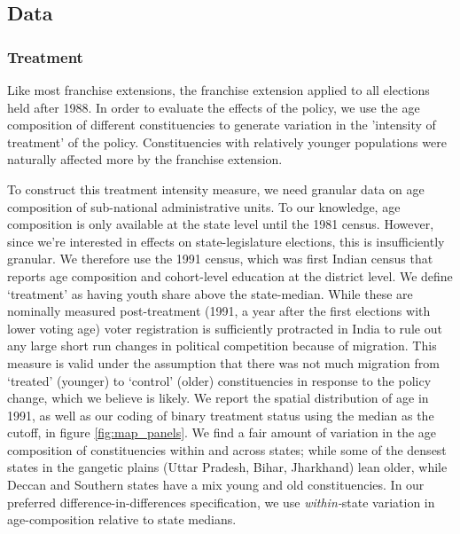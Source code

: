 


\label{sec:research_design}

\subsection{Data} %
\label{sub:data}

\subsubsection{Treatment}
Like most franchise extensions, the franchise extension applied to all
elections held after 1988. In order to evaluate the effects of the
policy, we use the age composition of different constituencies to
generate variation in the 'intensity of treatment' of the policy.
Constituencies with relatively younger populations were naturally
affected more by the franchise extension.

To construct this treatment intensity measure, we need granular data
on age composition of sub-national administrative units. To our
knowledge, age composition is only available at the state level until
the 1981 census. However, since we're interested in effects on
state-legislature elections, this is insufficiently granular. We
therefore use the 1991 census, which was first Indian census that
reports age composition and cohort-level education at the district
level. We define `treatment' as having youth share above the
state-median.  While these are nominally measured post-treatment
(1991, a year after the first elections with lower voting age) voter
registration is sufficiently protracted in India to rule out any large
short run changes in political competition because of migration. This
measure is valid under the assumption that there was not much
migration from `treated' (younger) to `control' (older) constituencies
in response to the policy change, which we believe is likely. We
report the spatial distribution of age in 1991, as well as our coding
of binary treatment status using the median as the cutoff, in figure
\ref{fig:map_panels}. We find a fair amount of variation in the age
composition of constituencies within and across states; while some of
the densest states in the gangetic plains (Uttar Pradesh, Bihar,
Jharkhand) lean older, while Deccan and Southern states have a mix
young and old constituencies. In our preferred
difference-in-differences specification, we use \emph{within-}state
variation in age-composition relative to state medians.

